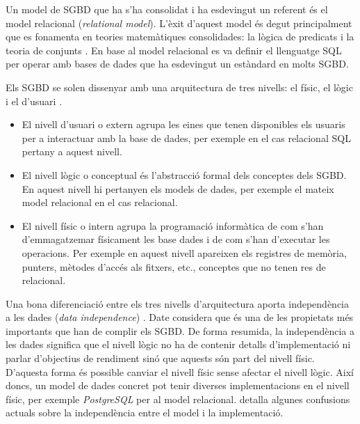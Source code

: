 Un model de \gls{SGBD} que ha s'ha consolidat i ha esdevingut un
referent és el model relacional (\emph{relational model}). L'èxit
d'aquest model és degut principalment que es fonamenta en teories
matemàtiques consolidades: la lògica de predicats i la teoria de
conjunts \parencite{date:introduction}. En base al model relacional es
va definir el llenguatge \gls{SQL} per operar amb bases de dades que
ha esdevingut un estàndard en molts \gls{SGBD}.


Els \gls{SGBD} se solen dissenyar amb una arquitectura de tres nivells: el
físic, el lògic i el d'usuari \parencite{date:introduction}. 
\begin{itemize}

\item El nivell d'usuari o extern agrupa les eines que tenen
  disponibles els usuaris per a interactuar amb la base de dades, per
  exemple en el cas relacional \gls{SQL} pertany a aquest nivell.

\item El nivell lògic o conceptual és l'abstracció formal dels
  conceptes dels \gls{SGBD}. En aquest nivell hi pertanyen els models de
  dades, per exemple el mateix model relacional en el cas relacional.

\item El nivell físic o intern agrupa la programació informàtica de
  com s'han d'emmagatzemar físicament les base dades i de com s'han
  d'executar les operacions. Per exemple en aquest nivell apareixen
  els registres de memòria, punters, mètodes d'accés als fitxers,
  etc., conceptes que no tenen res de relacional.
\end{itemize}


Una bona diferenciació entre els tres nivells d'arquitectura aporta
independència a les dades (\emph{data
  independence}) \parencite{date:dictionary}. Date considera que és
una de les propietats més importants que han de complir els
\gls{SGBD}. De forma resumida, la independència a les dades significa
que el nivell lògic no ha de contenir detalls d'implementació ni
parlar d'objectius de rendiment sinó que aquests són part del nivell
físic. D'aquesta forma és possible canviar el nivell físic sense
afectar el nivell lògic.  Així doncs, un model de dades
concret pot tenir diverses implementacions en el nivell físic, per
exemple \emph{PostgreSQL} \parencite{postgresql} per al model
relacional. \textcite{dbdebunk} detalla algunes confusions actuals
sobre la independència entre el model i la implementació.

